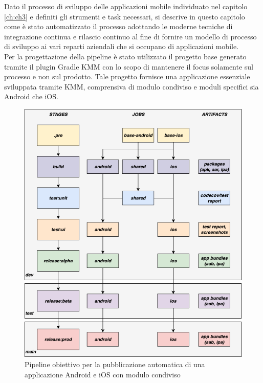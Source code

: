 
Dato il processo di sviluppo delle applicazioni mobile individuato nel capitolo \ref{ch:ch3} e definiti gli strumenti e task necessari, si descrive in questo capitolo come è stato automatizzato il processo adottando le moderne tecniche di integrazione continua e rilascio continuo al fine di fornire un modello di processo di sviluppo ai vari reparti aziendali che si occupano di applicazioni mobile.\\
Per la progettazione della pipeline è stato utilizzato il progetto base generato tramite il plugin Gradle KMM con lo scopo di mantenere il focus solamente sul processo e non sul prodotto. Tale progetto fornisce una applicazione essenziale sviluppata tramite KMM, comprensiva di modulo condiviso e moduli specifici sia Android che iOS.


\begin{figure}[H]
\centering
\includegraphics[width=\textwidth]{img/tesi-11-cicd.drawio.png}
\caption{Pipeline obiettivo per la pubblicazione automatica di una applicazione Android e iOS con modulo condiviso}
\end{figure}


